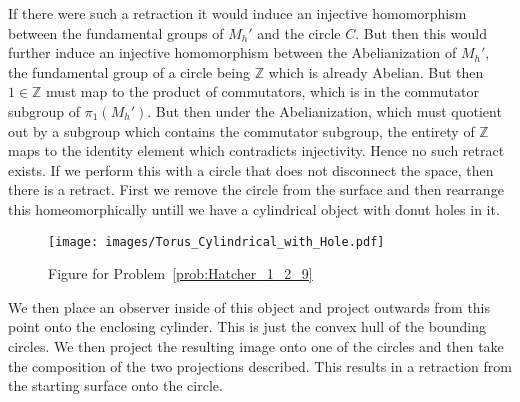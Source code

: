 \documentclass{article}                                                        %
\begin{document}
    \begin{solution}
        If there were such a retraction it would induce an injective
        homomorphism between the fundamental groups of $M_{h}'$ and the circle
        $C$. But then this would further induce an injective homomorphism
        between the Abelianization of $M_{h}'$, the fundamental group of a
        circle being $\mathbb{Z}$ which is already Abelian. But then
        $1\in\mathbb{Z}$ must map to the product of commutators, which is in the
        commutator subgroup of $\pi_{1}(M_{h}')$. But then under the
        Abelianization, which must quotient out by a subgroup which contains the
        commutator subgroup, the entirety of $\mathbb{Z}$ maps to the identity
        element which contradicts injectivity. Hence no such retract exists. If
        we perform this with a circle that does not disconnect the space, then
        there is a retract. First we remove the circle from the surface and then
        rearrange this homeomorphically untill we have a cylindrical object with
        donut holes in it.
        \begin{figure}[H]
            \centering
            \captionsetup{type=figure}
            \texttt{[image: images/Torus\_Cylindrical\_with\_Hole.pdf]}
            \caption{Figure for Problem~\ref{prob:Hatcher_1_2_9}}
            \label{fig:Hatcher_1_2_9}
        \end{figure}
        We then place an observer inside of this object and project outwards
        from this point onto the enclosing cylinder. This is just the convex
        hull of the bounding circles. We then project the resulting image onto
        one of the circles and then take the composition of the two projections
        described. This results in a retraction from the starting surface onto
        the circle.
    \end{solution}
\end{document}

